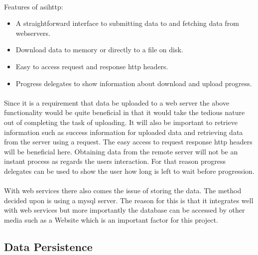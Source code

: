\documentclass[12pt]{article}
\begin{document}
\paragraph{}

Features of \gls{asihttp}:
\begin{itemize}
\item A straightforward interface to submitting data to and fetching data from webservers.
\item Download data to memory or directly to a file on disk.
\item Easy to access request and response \gls{http} headers.
\item Progress delegates to show information about download and upload progress.
\end{itemize}

\paragraph{}
Since it is a requirement that data be uploaded to a web server the above functionality would be quite beneficial in that it would take the tedious nature out of completing the task of uploading.
It will also be important to retrieve information such as success information for uploaded data and retrieving data from the server using a request. The easy access to request response \gls{http} headers will be beneficial here. Obtaining data from the remote server will not be an instant process as regards the users interaction. For that reason progress delegates can be used to show the user how long is left to wait before progression. 

\paragraph{}
With web services there also comes the issue of storing the data. The method decided upon is using a \gls{mysql} server. The reason for this is that it integrates well with web services but more importantly the database can be accessed by other media such as a Website which is an important factor for this project.




\subsection{Data Persistence}
\end{document}
